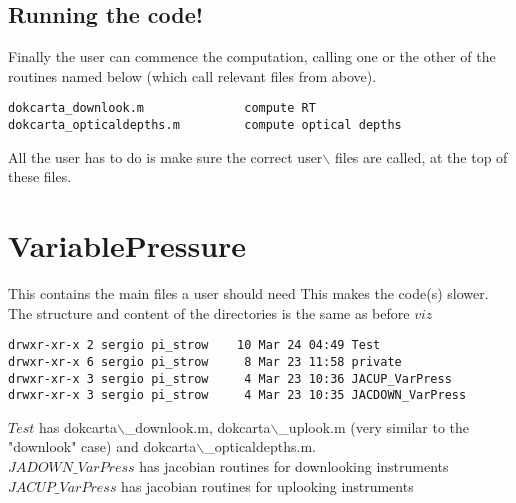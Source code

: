 \documentclass[11pt]{article}
\begin{document}
\subsection{Running the code!}
\label{sec-3-3}

Finally the user can commence the computation, calling one or the other
of the routines named below (which call relevant files from above).

\begin{verbatim}
dokcarta_downlook.m              compute RT
dokcarta_opticaldepths.m         compute optical depths
\end{verbatim}

All the user has to do is make sure the correct user$\backslash$ files are called,
at the top of these files.

\section{VariablePressure}
\label{sec-4}

This contains the main files a user should need This makes the code(s)
slower. The structure and content of the directories is the same as
before \(viz\)

\begin{verbatim}
drwxr-xr-x 2 sergio pi_strow    10 Mar 24 04:49 Test
drwxr-xr-x 6 sergio pi_strow     8 Mar 23 11:58 private
drwxr-xr-x 3 sergio pi_strow     4 Mar 23 10:36 JACUP_VarPress
drwxr-xr-x 3 sergio pi_strow     4 Mar 23 10:35 JACDOWN_VarPress
\end{verbatim}

\(Test\) has dokcarta$\backslash$\_downlook.m, dokcarta$\backslash$\_uplook.m (very similar to the
"downlook" case) and dokcarta$\backslash$\_opticaldepths.m.\\

\(JADOWN\_VarPress\) has jacobian routines for downlooking instruments\\

\(JACUP\_VarPress\) has jacobian routines for uplooking instruments\\
\end{document}

